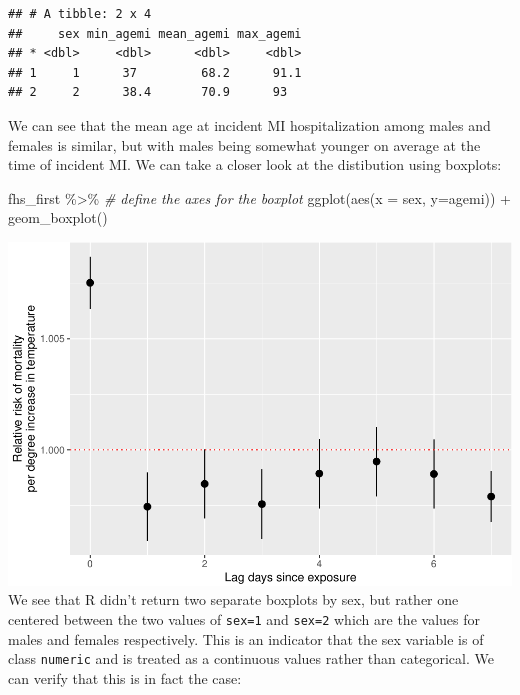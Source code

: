 \documentclass[
]{book}
\newenvironment{Shaded}{\begin{snugshade}}{\end{snugshade}}
\newcommand{\AttributeTok}[1]{\textcolor[rgb]{0.77,0.63,0.00}{#1}}
\newcommand{\CommentTok}[1]{\textcolor[rgb]{0.56,0.35,0.01}{\textit{#1}}}
\newcommand{\FunctionTok}[1]{\textcolor[rgb]{0.00,0.00,0.00}{#1}}
\newcommand{\NormalTok}[1]{#1}
\newcommand{\SpecialCharTok}[1]{\textcolor[rgb]{0.00,0.00,0.00}{#1}}
\begin{document}
\begin{verbatim}
## # A tibble: 2 x 4
##     sex min_agemi mean_agemi max_agemi
## * <dbl>     <dbl>      <dbl>     <dbl>
## 1     1      37         68.2      91.1
## 2     2      38.4       70.9      93
\end{verbatim}

We can see that the mean age at incident MI hospitalization among males and females is similar, but with males being somewhat younger on average at the time of incident MI. We can take a closer look at the distibution using boxplots:

\begin{Shaded}
\begin{Highlighting}[]
\NormalTok{fhs\_first }\SpecialCharTok{\%\textgreater{}\%} 
  \CommentTok{\# define the axes for the boxplot}
  \FunctionTok{ggplot}\NormalTok{(}\FunctionTok{aes}\NormalTok{(}\AttributeTok{x =}\NormalTok{ sex, }\AttributeTok{y=}\NormalTok{agemi)) }\SpecialCharTok{+} 
  \FunctionTok{geom\_boxplot}\NormalTok{()}
\end{Highlighting}
\end{Shaded}

\includegraphics{adv_epi_analysis_files/figure-latex/unnamed-chunk-90-1.pdf}
We see that R didn't return two separate boxplots by sex, but rather one centered between the two values of \texttt{sex=1} and \texttt{sex=2} which are the values for males and females respectively. This is an indicator that the sex variable is of class \texttt{numeric} and is treated as a continuous values rather than categorical. We can verify that this is in fact the case:

\begin{Shaded}
\end{Shaded}
\end{document}
